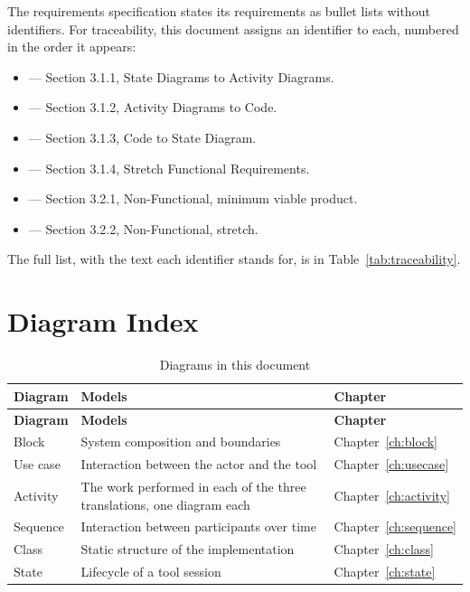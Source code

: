 The requirements specification states its requirements as bullet lists without
identifiers. For traceability, this document assigns an identifier to each,
numbered in the order it appears:

\begin{itemize}[nosep]
	\item {} --- Section 3.1.1, State Diagrams to Activity Diagrams.
	\item {} --- Section 3.1.2, Activity Diagrams to Code.
	\item {} --- Section 3.1.3, Code to State Diagram.
	\item {} --- Section 3.1.4, Stretch Functional Requirements.
	\item {} --- Section 3.2.1, Non-Functional, minimum viable product.
	\item {} --- Section 3.2.2, Non-Functional, stretch.
\end{itemize}

The full list, with the text each identifier stands for, is in
Table~\ref{tab:traceability}.

\section{Diagram Index}

\begin{longtable}{L{0.20\textwidth}L{0.42\textwidth}L{0.28\textwidth}}
	\caption{Diagrams in this document}\label{tab:diagram-index}\\
	\toprule
	\textbf{Diagram} & \textbf{Models} & \textbf{Chapter} \\
	\midrule
	\endfirsthead
	\toprule
	\textbf{Diagram} & \textbf{Models} & \textbf{Chapter} \\
	\midrule
	\endhead
	Block    & System composition and boundaries         & Chapter~\ref{ch:block} \\
	Use case & Interaction between the actor and the tool & Chapter~\ref{ch:usecase} \\
	Activity & The work performed in each of the three translations, one diagram each & Chapter~\ref{ch:activity} \\
	Sequence & Interaction between participants over time & Chapter~\ref{ch:sequence} \\
	Class    & Static structure of the implementation     & Chapter~\ref{ch:class} \\
	State    & Lifecycle of a tool session                & Chapter~\ref{ch:state} \\
	\bottomrule
\end{longtable}
